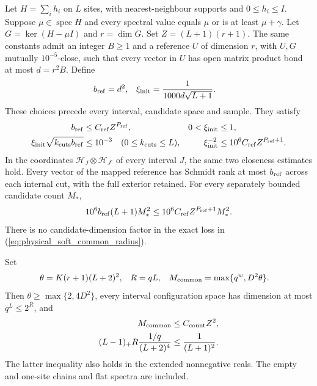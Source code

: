 \begin{lemma}
    Let $H=\sum_i h_i$ on $L$ sites, with nearest-neighbour supports and
    $0\le h_i\le I$. Suppose $\mu\in\operatorname{spec}H$ and every
    spectral value equals $\mu$ or is at least $\mu+\gamma$.
    Let $G=\ker(H-\mu I)$ and $r=\dim G$. Set $Z=(L+1)(r+1)$.
    The same constants admit an integer $B\ge1$ and a reference $U$ of
    dimension $r$, with $U,G$ mutually $10^{-5}$-close, such that every
    vector in $U$ has open matrix product bond at most $d=r^2B$.
    Define
    \begin{align}
        b_{\rm ref}    & =d^2,                     &
        \xi_{\rm init} & =\frac1{1000d\sqrt{L+1}}.
        \label{eq:physical_soft_common_reference}
    \end{align}
    These choices precede every interval, candidate space and sample.
    They satisfy
    \begin{align}
        b_{\rm ref}                                  & \le C_{\rm ref}Z^{P_{\rm ref}},      &
        0<\xi_{\rm init}                             & \le1,\notag                            \\
        \xi_{\rm init}\sqrt{k_{\rm cuts}b_{\rm ref}} & \le10^{-3}
        \quad(0\le k_{\rm cuts}\le L),               &
        \xi_{\rm init}^{-2}                          & \le10^6C_{\rm ref}Z^{P_{\rm ref}+1}.
        \label{eq:physical_soft_common_radius}
    \end{align}
    In the coordinates $\mathcal H_J\otimes\mathcal H_{J^c}$ of every
    interval $J$, the same two closeness estimates hold. Every vector of
    the mapped reference has Schmidt rank at most $b_{\rm ref}$ across
    each internal cut, with the full exterior retained.
    For every separately bounded candidate count $M_*$,
    \begin{align}
        10^6b_{\rm ref}(L+1)M_*^2
        \le10^6C_{\rm ref}Z^{P_{\rm ref}+1}M_*^2.
        \label{eq:physical_soft_common_output_profile}
    \end{align}
    There is no candidate-dimension factor in the exact loss in
    (\ref{eq:physical_soft_common_radius}).

    Set
    \begin{align}
        \theta         & =K(r+1)(L+2)^2,         & R & =qL, &
        M_{\rm common} & =\max\{q^w,D^2\theta\}.
        \label{eq:physical_soft_common_schedule}
    \end{align}
    Then $\theta\ge\max\{2,4D^2\}$, every interval configuration space
    has dimension at most $q^L\le2^R$, and
    \begin{align}
        M_{\rm common}              & \le C_{\rm count}Z^2,\notag \\
        (L-1)_+R\frac{1/q}{(L+2)^4} & \le\frac1{(L+1)^2}.
        \label{eq:physical_soft_common_sampling_profile}
    \end{align}
    The latter inequality also holds in the extended nonnegative reals.
    The empty and one-site chains and flat spectra are included.
\end{lemma}

